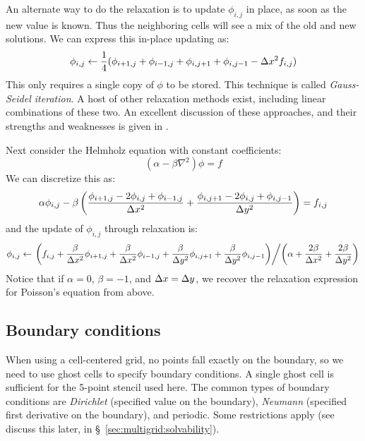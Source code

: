 An alternate way to do the relaxation is to update $\phi_{i,j}$ in
place, as soon as the new value is known.  Thus the neighboring cells
will see a mix of the old and new solutions.  We can express this in-place
updating as:
\begin{equation}
\phi_{i,j} \leftarrow \frac{1}{4} (\phi_{i+1,j} + \phi_{i-1,j} + 
                                   \phi_{i,j+1} + \phi_{i,j-1} - 
                                   \Delta x^2 f_{i,j} )
\end{equation}
This only requires a single copy of $\phi$ to be stored.  This
technique is called {\em Gauss-Seidel iteration}.  A host of other
relaxation methods exist, including linear combinations of these two.
An excellent discussion of these approaches, and their
strengths and weaknesses is given in \cite{multigridtutorial}.

Next consider the Helmholz equation with constant coefficients:
\begin{equation}
(\alpha - \beta \nabla^2) \phi = f
\end{equation}
We can discretize this as:
\begin{equation}
\alpha \phi_{i,j} - \beta \left ( 
    \frac{\phi_{i+1,j} - 2 \phi_{i,j} + \phi_{i-1,j}}{\Delta x^2} +
    \frac{\phi_{i,j+1} - 2 \phi_{i,j} + \phi_{i,j-1}}{\Delta y^2} \right )
= f_{i,j}
\end{equation}
and the update of $\phi_{i,j}$ through relaxation is:
\begin{equation}
\phi_{i,j} \leftarrow
     \left . \left ( f_{i,j} + \frac{\beta}{\Delta x^2} \phi_{i+1,j}
                             + \frac{\beta}{\Delta x^2} \phi_{i-1,j}
                             + \frac{\beta}{\Delta y^2} \phi_{i,j+1}
                             + \frac{\beta}{\Delta y^2} \phi_{i,j-1} \right ) 
\middle / \left ( \alpha + \frac{2 \beta}{\Delta x^2} + \frac{2 \beta}{\Delta y^2} \right ) \right .
\end{equation}
Notice that if $\alpha = 0$, $\beta = -1$, and $\Delta x = \Delta y$, we 
recover the relaxation expression for Poisson's equation from above.


\subsection{Boundary conditions}

When using a cell-centered grid, no points fall exactly on the
boundary, so we need to use ghost cells to specify boundary
conditions.  A single ghost cell is sufficient for the 5-point stencil
used here.  The common types of boundary conditions are {\em
  Dirichlet} (specified value on the boundary), {\em Neumann}
(specified first derivative on the boundary), and periodic.  Some
restrictions apply (see discuss this later, in
\S~\ref{sec:multigrid:solvability}).

